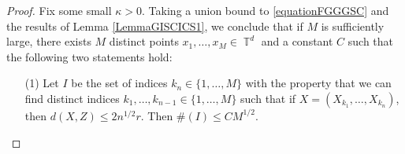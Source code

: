 \documentclass[dvipsnames,letterpaper,12pt]{article}
\numberwithin{equation}{section}
\DeclareMathOperator{\TT}{\mathbb{T}}
\numberwithin{theorem}{section}
\DeclareMathOperator{\PP}{\mathbb{P}}
\begin{document}
\begin{proof}
    Fix some small $\kappa > 0$. Taking a union bound to \eqref{equationFGGGSC} %
    and the results of Lemma \ref{LemmaGISCICS1}, we conclude that if $M$ is sufficiently large, there exists $M$ distinct points $x_1, \dots, x_M \in \TT^d$ and a constant $C$ such that the following two statements hold:
    \begin{itemize}
        \item[(1)] Let $I$ be the set of indices $k_n \in \{ 1, \dots, M \}$ with the property that we can find distinct indices $k_1, \dots, k_{n-1} \in \{ 1, \dots, M \}$ such that if $X = (X_{k_1}, \dots, X_{k_n})$, then $d(X, Z) \leq 2n^{1/2}r$. Then $\#(I) \leq C M^{1/2}$.


\end{itemize}
\end{proof}
\end{document}
